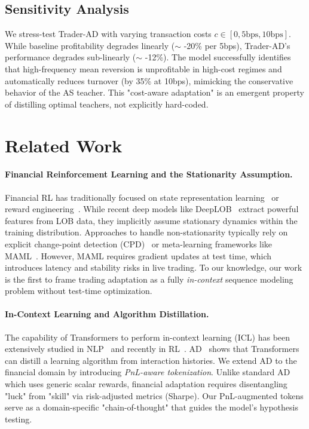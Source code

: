 \documentclass{article}
\begin{document}
\subsection{Sensitivity Analysis}
We stress-test Trader-AD with varying transaction costs $c \in [0, 5\text{bps}, 10\text{bps}]$. While baseline profitability degrades linearly ($\sim$ -20\% per 5bps), Trader-AD's performance degrades sub-linearly ($\sim$ -12\%). The model successfully identifies that high-frequency mean reversion is unprofitable in high-cost regimes and automatically reduces turnover (by 35\% at 10bps), mimicking the conservative behavior of the AS teacher. This "cost-aware adaptation" is an emergent property of distilling optimal teachers, not explicitly hard-coded.

\section{Related Work}
\label{sec:related}

\paragraph{Financial Reinforcement Learning and the Stationarity Assumption.}
Financial RL has traditionally focused on state representation learning~\citep{zhang2019deeptrading,lei2020time} or reward engineering~\citep{nevmyvaka2006execution,jiang2017portfolio}. While recent deep models like DeepLOB~\citep{zhang2019deeplob} extract powerful features from LOB data, they implicitly assume stationary dynamics within the training distribution. Approaches to handle non-stationarity typically rely on explicit change-point detection (CPD)~\citep{wei2021nonstationary} or meta-learning frameworks like MAML~\citep{finn2017maml,wang2021metalearning}. However, MAML requires gradient updates at test time, which introduces latency and stability risks in live trading. To our knowledge, our work is the first to frame trading adaptation as a fully \emph{in-context} sequence modeling problem without test-time optimization.

\paragraph{In-Context Learning and Algorithm Distillation.}
The capability of Transformers to perform in-context learning (ICL) has been extensively studied in NLP~\citep{brown2020language} and recently in RL~\citep{laskin2023context}. AD~\citep{laskin2023context} shows that Transformers can distill a learning algorithm from interaction histories. We extend AD to the financial domain by introducing \emph{PnL-aware tokenization}. Unlike standard AD which uses generic scalar rewards, financial adaptation requires disentangling "luck" from "skill" via risk-adjusted metrics (Sharpe). Our PnL-augmented tokens serve as a domain-specific "chain-of-thought" that guides the model's hypothesis testing.
\end{document}

